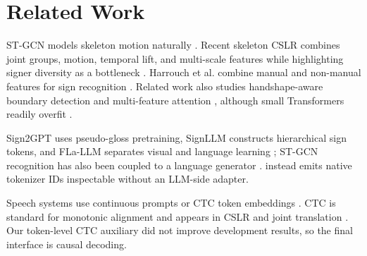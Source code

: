 \section{Related Work}

ST-GCN models skeleton motion naturally \citep{yan2018stgcn}.  Recent skeleton
CSLR combines joint groups, motion, temporal lift, and multi-scale features while
highlighting signer diversity as a bottleneck
\citep{min2025skeleton,nam2026liftsign,wang2025stnet}.  Harrouch et al. combine
manual and non-manual features for sign recognition
\citep{harrouch2026manual}.  Related work also studies handshape-aware boundary
detection \citep{zhao2026multimodal} and multi-feature attention
\citep{yenisari2025multifeature}, although small Transformers readily overfit
\citep{huamaniLessIsMore}.

Sign2GPT uses pseudo-gloss pretraining, SignLLM constructs hierarchical sign tokens,
and FLa-LLM separates visual and language learning
\citep{wong2024sign2gpt,gong2024signllm,chen2024flallm}; ST-GCN recognition has
also been coupled to a language generator \citep{pai2026tsl}.  \system{} instead
emits native tokenizer IDs inspectable without an LLM-side adapter.

Speech systems use continuous prompts or CTC token embeddings
\citep{deng2025wav2prompt,ma2025legoslm}.  CTC is standard for monotonic
alignment \citep{graves2006ctc} and appears in CSLR and joint translation
\citep{camgoz2020signtransformers,tan2025textctc}.  Our token-level CTC auxiliary
did not improve development results, so the final interface is causal decoding.
